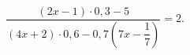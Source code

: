\begin{ex}[type=equation]
	\begin{condition}
		$\dfrac{(2x - 1)\cdot0,3 - 5}{(4x + 2) \cdot0,6 -0,7\left(7x - \dfrac{1}{7}\right)}=2.$
	\end{condition}
\end{ex}